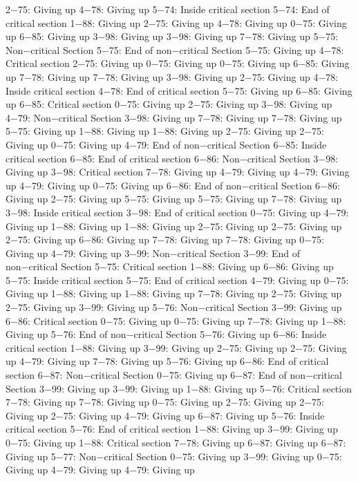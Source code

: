 2−75: Giving up
4−78: Giving up
5−74: Inside critical section
5−74: End of critical section
1−88: Giving up
2−75: Giving up
4−78: Giving up
0−75: Giving up
6−85: Giving up
3−98: Giving up
3−98: Giving up
7−78: Giving up
5−75: Non−critical Section
5−75: End of non−critical Section
5−75: Giving up
4−78: Critical section
2−75: Giving up
0−75: Giving up
0−75: Giving up
6−85: Giving up
7−78: Giving up
7−78: Giving up
3−98: Giving up
2−75: Giving up
4−78: Inside critical section
4−78: End of critical section
5−75: Giving up
6−85: Giving up
6−85: Critical section
0−75: Giving up
2−75: Giving up
3−98: Giving up
4−79: Non−critical Section
3−98: Giving up
7−78: Giving up
7−78: Giving up
5−75: Giving up
1−88: Giving up
1−88: Giving up
2−75: Giving up
2−75: Giving up
0−75: Giving up
4−79: End of non−critical Section
6−85: Inside critical section
6−85: End of critical section
6−86: Non−critical Section
3−98: Giving up
3−98: Critical section
7−78: Giving up
4−79: Giving up
4−79: Giving up
4−79: Giving up
0−75: Giving up
6−86: End of non−critical Section
6−86: Giving up
2−75: Giving up
5−75: Giving up
5−75: Giving up
7−78: Giving up
3−98: Inside critical section
3−98: End of critical section
0−75: Giving up
4−79: Giving up
1−88: Giving up
1−88: Giving up
2−75: Giving up
2−75: Giving up
2−75: Giving up
6−86: Giving up
7−78: Giving up
7−78: Giving up
0−75: Giving up
4−79: Giving up
3−99: Non−critical Section
3−99: End of non−critical Section
5−75: Critical section
1−88: Giving up
6−86: Giving up
5−75: Inside critical section
5−75: End of critical section
4−79: Giving up
0−75: Giving up
1−88: Giving up
1−88: Giving up
7−78: Giving up
2−75: Giving up
2−75: Giving up
3−99: Giving up
5−76: Non−critical Section
3−99: Giving up
6−86: Critical section
0−75: Giving up
0−75: Giving up
7−78: Giving up
1−88: Giving up
5−76: End of non−critical Section
5−76: Giving up
6−86: Inside critical section
1−88: Giving up
3−99: Giving up
2−75: Giving up
2−75: Giving up
4−79: Giving up
7−78: Giving up
5−76: Giving up
6−86: End of critical section
6−87: Non−critical Section
0−75: Giving up
6−87: End of non−critical Section
3−99: Giving up
3−99: Giving up
1−88: Giving up
5−76: Critical section
7−78: Giving up
7−78: Giving up
0−75: Giving up
2−75: Giving up
2−75: Giving up
2−75: Giving up
4−79: Giving up
6−87: Giving up
5−76: Inside critical section
5−76: End of critical section
1−88: Giving up
3−99: Giving up
0−75: Giving up
1−88: Critical section
7−78: Giving up
6−87: Giving up
6−87: Giving up
5−77: Non−critical Section
0−75: Giving up
3−99: Giving up
0−75: Giving up
4−79: Giving up
4−79: Giving up

